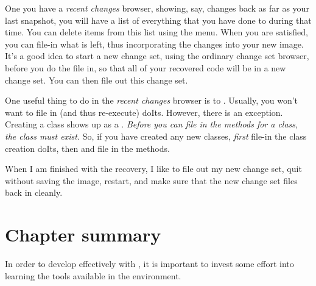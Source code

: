 \documentclass[a4paper,10pt,twoside]{book}
\begin{document}
One you have a \emph{recent changes} browser, showing, say, changes back as far as your last snapshot, you will have a list of everything that you have done to \pharo during that time. 
You can delete items from this list using the \actclick menu.
When you are satisfied, you can file-in what is left, thus incorporating the changes into your new image.
It's a good idea to start a new change set, using the ordinary change set browser, before you do the file in, so that all of your recovered code will be in a new change set. 
You can then file out this change set.

One useful thing to do in the \emph{recent changes} browser is to . 
Usually, you won't want to file in (and thus re-execute) doIts. 
However, there is an exception. 
Creating a class shows up as a .
\emph{Before you can file in the methods for a class, the class must exist.}
So, if you have created any new classes, \emph{first} file-in the class creation doIts, then  and file in the methods.

When I am finished with the recovery, I like to file out my new change set, quit \pharo without saving the image, restart, and make sure that the new change set files back in cleanly.

\section{Chapter summary}

In order to develop effectively with \pharo, it is important to invest some effort into learning the tools available in the environment.
\end{document}
